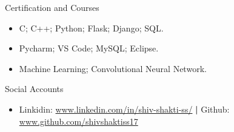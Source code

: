 \documentclass[]{shivshakti}
\begin{document}
	\begin{cvsection}{Certification and Courses}
		\begin{cvsubsection}{}{}{}	
			\begin{itemize}
				\item C; C++; Python; Flask; Django; SQL.
				\item Pycharm; VS Code; MySQL; Eclipse. 
				\item Machine Learning; Convolutional Neural Network.
				
			\end{itemize}
		\end{cvsubsection}
	\end{cvsection}
	
	\begin{cvsection}{Social Accounts}
		\begin{cvsubsection}{}{}{}	
			\begin{itemize}
				\item Linkidin: \url{www.linkedin.com/in/shiv-shakti-ss/} \textbf{|}  Github: \url{www.github.com/shivshaktiss17} 
				
			\end{itemize}
		\end{cvsubsection}
	\end{cvsection}
	
\end{document}
